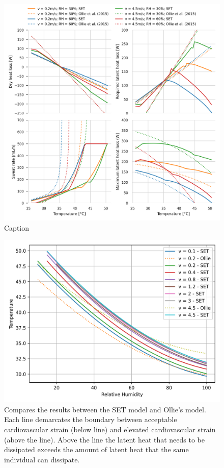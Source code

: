 \begin{figure}
    \centering
    \includegraphics[width=\textwidth]{figures/comparison_models_v2.png}
    \caption{Caption}
    \label{fig:comparison_models}
\end{figure}

\begin{figure}
    \centering
    \includegraphics[width=\textwidth]{figures/comparison_air_speed.png}
    \caption{Compares the results between the SET model and Ollie's model.
    Each line demarcates the boundary between acceptable cardiovascular strain (below line) and elevated cardiovascular strain (above the line).
    Above the line the latent heat that needs to be dissipated exceeds the amount of latent heat that the same individual can dissipate. }
    \label{fig:comparison_air_speed}
\end{figure}

